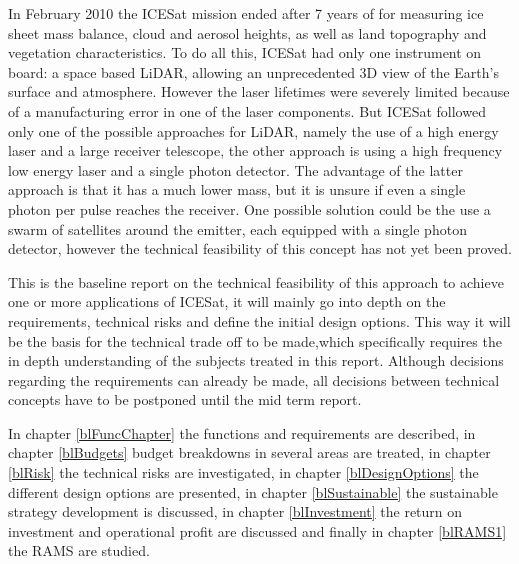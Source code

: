In February 2010 the ICESat mission ended after 7 years of for measuring ice sheet mass balance, cloud and aerosol heights, as well as land topography and vegetation characteristics.
To do all this, ICESat had only one instrument on board: a space based \ac{LiDAR}, allowing an unprecedented 3D view of the Earth's surface and atmosphere.
However the laser lifetimes were severely limited because of a manufacturing error in one of the laser components.
But ICESat followed only one of the possible approaches for \ac{LiDAR}, namely the use of a high energy laser and a large receiver telescope, the other approach is using a high frequency low energy laser and a single photon detector. The advantage of the latter approach is that it has a much lower mass, but it is unsure if even a single photon per pulse reaches the receiver. One possible solution could be the use a swarm of satellites around the emitter, each equipped with a single photon detector, however the technical feasibility of this concept has not yet been proved.

This is the baseline report on the technical feasibility of this approach to achieve one or more applications of ICESat, it will mainly go into depth on the requirements, technical risks and define the initial design options. This way it will be the basis for the technical trade off to be made,which specifically requires the in depth understanding of the subjects treated in this report. Although decisions regarding the requirements can already be made, all decisions between technical concepts have to be postponed until the mid term report.

In chapter \ref{blFuncChapter} the functions and requirements are described, in chapter \ref{blBudgets} budget breakdowns in several areas are treated, in chapter \ref{blRisk} the technical risks are investigated, in chapter \ref{blDesignOptions} the different design options are presented, in chapter \ref{blSustainable} the sustainable strategy development is discussed, in chapter \ref{blInvestment} the return on investment and operational profit are discussed and finally in chapter \ref{blRAMS1} the \ac{RAMS} are studied.